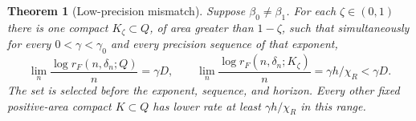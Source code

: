 \documentclass[11pt]{amsart}
\newtheorem{theorem}{Theorem}[section]
\theoremstyle{definition}
\theoremstyle{remark}
\numberwithin{equation}{section}
\begin{document}
\begin{theorem}[Low-precision mismatch]\label{thm:mismatch}
Suppose $\beta_0\ne\beta_1$. For each $\zeta\in(0,1)$ there is
one compact $K_\zeta\subset Q$, of area greater than $1-\zeta$,
such that simultaneously for every $0<\gamma<\gamma_0$ and
every precision sequence of that exponent,
\begin{equation}\label{eq:mismatchrates}
\lim_n\frac{\log r_F(n,\delta_n;Q)}n=\gamma D,\qquad
\lim_n\frac{\log r_F(n,\delta_n;K_\zeta)}n
                =\gamma h/\chi_R<\gamma D.
\end{equation}
The set is selected before the exponent, sequence, and horizon.
Every other fixed positive-area compact $K\subset Q$ has lower
rate at least $\gamma h/\chi_R$ in this range.
\end{theorem}
\end{document}
